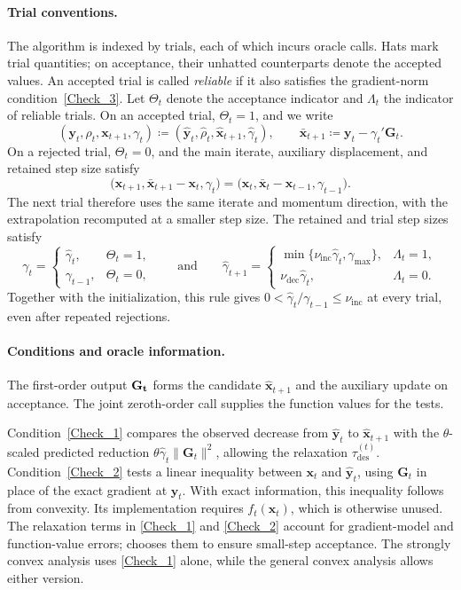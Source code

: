 \documentclass{article}
\begin{document}
\paragraph{Trial conventions.}
The algorithm is indexed by trials, each of which incurs oracle
calls. Hats mark trial quantities; on acceptance, their unhatted
counterparts denote the accepted values. An accepted trial is
called \emph{reliable} if it also satisfies the gradient-norm
condition~\eqref{Check_3}. Let \(\Theta_t\) denote the acceptance indicator
and \(\Lambda_t\) the indicator of reliable trials.
On an accepted trial, \(\Theta_t=1\), and we write
\[
(\bm{y}_t,\rho_t,\bm{x}_{t+1},\gamma_t)
\coloneqq 
(\hat {\bm{y}}_t,\hat\rho_t,\hat {\bm{x}}_{t+1},\hat\gamma_t),
\qquad
\bar {\bm{x}}_{t+1}\coloneqq \bm{y}_t-\gamma_t'\mathbf{G}_t.
\]
On a rejected trial, \(\Theta_t=0\), and the main iterate,
auxiliary displacement, and retained step size satisfy
\[
\bigl(\bm{x}_{t+1},\bar {\bm{x}}_{t+1}-\bm{x}_t,\gamma_t\bigr)
=
\bigl(\bm{x}_t,\bar {\bm{x}}_t-\bm{x}_{t-1},\gamma_{t-1}\bigr).
\] The next trial therefore uses the same iterate and momentum direction, with the extrapolation recomputed at a smaller step size. The retained and trial step sizes satisfy
\begin{equation}\label{eq:gamma-dyn}
\gamma_t=
\begin{cases}
\hat\gamma_t,&\Theta_t=1,\\
\gamma_{t-1},&\Theta_t=0,
\end{cases}
\qquad \text{and}\qquad
\hat\gamma_{t+1}=
\begin{cases}
\min\{\nu_{\mathrm{inc}}\hat\gamma_t,\gamma_{\max}\},
&\Lambda_t=1,\\
\nu_{\mathrm{dec}}\hat\gamma_t,
&\Lambda_t=0.
\end{cases}
\end{equation}
Together with the initialization, this rule gives $0<\hat\gamma_t/\gamma_{t-1}\leq\nu_{\mathrm{inc}}$ at every trial, even after repeated rejections.

\paragraph{Conditions and oracle information.}
The first-order output $\bf{G}_t$ forms the candidate $\hat{\bm{x}}_{t+1}$ and the auxiliary update on acceptance.
The joint zeroth-order call supplies the function values for the tests. 

Condition~\eqref{Check_1} compares the observed decrease from $\hat{\bm{y}}_t$ to $\hat{\bm{x}}_{t+1}$ with the $\theta$-scaled predicted reduction $\theta\hat\gamma_t\|\mathbf{G}_t\|^2$, allowing the relaxation $\tau_{\mathrm{des}}^{(t)}$.
Condition~\eqref{Check_2} tests a linear inequality between $\bm{x}_t$ and $\hat{\bm{y}}_t$, using $\mathbf{G}_t$ in place of the exact gradient at $\hat{\bm{y}}_t$. With exact information,
this inequality follows from convexity. Its implementation requires
\(f_t(\bm{x}_t)\), which is otherwise unused.
The relaxation terms in \eqref{Check_1} and \eqref{Check_2} account for gradient-model and function-value errors;  chooses them to ensure small-step acceptance. The strongly convex analysis uses \eqref{Check_1} alone, while the general convex analysis allows either version.
\end{document}
